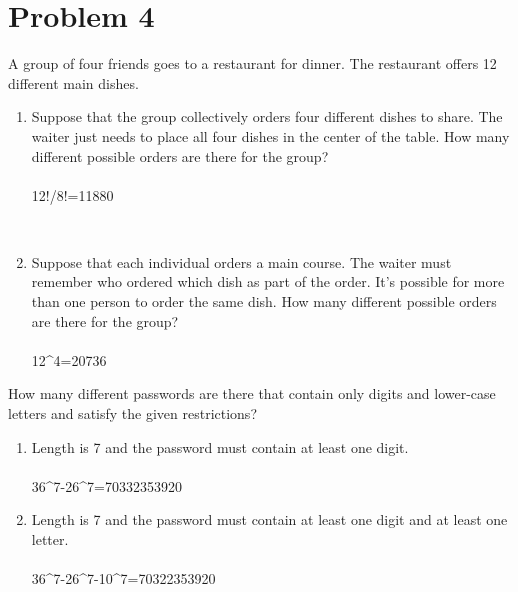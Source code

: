 \documentclass{amsart}
\theoremstyle{definition}
\theoremstyle{Exercise}
\theoremstyle{remark}
\theoremstyle{rule}
\numberwithin{equation}{section}
\begin{document}
\section*{Problem 4}
A group of four friends goes to a restaurant for dinner. The restaurant offers 12 different main dishes.\\
    \begin{enumerate}[label=(\roman*)]
    \item Suppose that the group collectively orders four different dishes to share. The waiter just needs to place all four dishes in the center of the table. How many different possible orders are there for the group?\\\\
12!/8!=11880

\\
    \item Suppose that each individual orders a main course. The waiter must remember who ordered which dish as part of the order. It's possible for more than one person to order the same dish. How many different possible orders are there for the group?\\\\
12^{4}=20736
\\

    \end{enumerate}


How many different passwords are there that contain only digits and lower-case letters and satisfy the given restrictions?\\
      \begin{enumerate}[label=(\roman*), start=3]
    \item Length is 7 and the password must contain at least one digit.\\\\
36^{7}-26^{7}=70332353920
\\
\item Length is 7 and the password must contain at least one digit and at least one letter.\\\\
36^{7}-26^{7}-10^{7}=70322353920
\\
    \end{enumerate}
 
\end{document}
